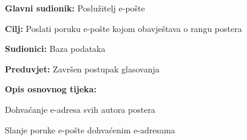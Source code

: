 					\noindent {}
					\begin{packed_item}
						
						\item \textbf{Glavni sudionik: } Poslužitelj e-pošte
						\item  \textbf{Cilj:} Poslati poruku e-pošte kojom obavještava o rangu postera
						\item  \textbf{Sudionici:} Baza podataka
						\item  \textbf{Preduvjet:} Završen postupak glasovanja
						\item  \textbf{Opis osnovnog tijeka:}
						
						\item[] \begin{packed_enum}
							
							\item Dohvaćanje e-adresa svih autora postera
							\item Slanje poruke e-pošte dohvaćenim e-adresama
							
						\end{packed_enum}
						
					\end{packed_item}
					
